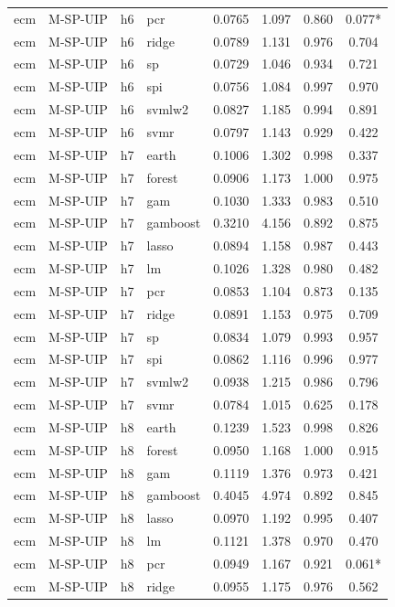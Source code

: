 \begin{ThreePartTable}
\begin{longtable}[t]{llclcccc}
ecm & M-SP-UIP & h6 & pcr & 0.0765 & 1.097 & 0.860 & 0.077*\\
ecm & M-SP-UIP & h6 & ridge & 0.0789 & 1.131 & 0.976 & 0.704\\
ecm & M-SP-UIP & h6 & sp & 0.0729 & 1.046 & 0.934 & 0.721\\
ecm & M-SP-UIP & h6 & spi & 0.0756 & 1.084 & 0.997 & 0.970\\
ecm & M-SP-UIP & h6 & svmlw2 & 0.0827 & 1.185 & 0.994 & 0.891\\
ecm & M-SP-UIP & h6 & svmr & 0.0797 & 1.143 & 0.929 & 0.422\\
\addlinespace
ecm & M-SP-UIP & h7 & earth & 0.1006 & 1.302 & 0.998 & 0.337\\
ecm & M-SP-UIP & h7 & forest & 0.0906 & 1.173 & 1.000 & 0.975\\
ecm & M-SP-UIP & h7 & gam & 0.1030 & 1.333 & 0.983 & 0.510\\
ecm & M-SP-UIP & h7 & gamboost & 0.3210 & 4.156 & 0.892 & 0.875\\
ecm & M-SP-UIP & h7 & lasso & 0.0894 & 1.158 & 0.987 & 0.443\\
ecm & M-SP-UIP & h7 & lm & 0.1026 & 1.328 & 0.980 & 0.482\\
ecm & M-SP-UIP & h7 & pcr & 0.0853 & 1.104 & 0.873 & 0.135\\
ecm & M-SP-UIP & h7 & ridge & 0.0891 & 1.153 & 0.975 & 0.709\\
ecm & M-SP-UIP & h7 & sp & 0.0834 & 1.079 & 0.993 & 0.957\\
ecm & M-SP-UIP & h7 & spi & 0.0862 & 1.116 & 0.996 & 0.977\\
ecm & M-SP-UIP & h7 & svmlw2 & 0.0938 & 1.215 & 0.986 & 0.796\\
ecm & M-SP-UIP & h7 & svmr & 0.0784 & 1.015 & 0.625 & 0.178\\
\addlinespace
ecm & M-SP-UIP & h8 & earth & 0.1239 & 1.523 & 0.998 & 0.826\\
ecm & M-SP-UIP & h8 & forest & 0.0950 & 1.168 & 1.000 & 0.915\\
ecm & M-SP-UIP & h8 & gam & 0.1119 & 1.376 & 0.973 & 0.421\\
ecm & M-SP-UIP & h8 & gamboost & 0.4045 & 4.974 & 0.892 & 0.845\\
ecm & M-SP-UIP & h8 & lasso & 0.0970 & 1.192 & 0.995 & 0.407\\
ecm & M-SP-UIP & h8 & lm & 0.1121 & 1.378 & 0.970 & 0.470\\
ecm & M-SP-UIP & h8 & pcr & 0.0949 & 1.167 & 0.921 & 0.061*\\
ecm & M-SP-UIP & h8 & ridge & 0.0955 & 1.175 & 0.976 & 0.562\\

\end{longtable}
\end{ThreePartTable}

